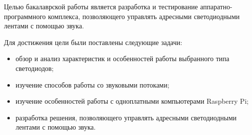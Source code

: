 Целью бакалаврской работы является разработка и тестирование аппаратно-программного комплекса, позволяющего управлять адресными светодиодными лентами с помощью звука.

Для достижения цели были поставлены следующие задачи:

\begin{itemize}
  \item обзор и анализ характеристик и особенностей работы выбранного типа светодиодов;
  \item изучение способов работы со звуковыми потоками;
  \item изучение особенностей работы с одноплатными компьютерами Raspberry Pi;
  \item разработка решения, позволяющего управлять адресными светодиодными лентами с помощью звука.
\end{itemize}